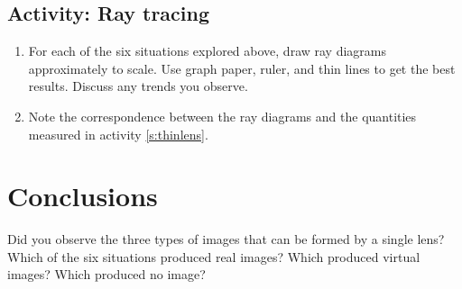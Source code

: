 \begin{multicols}{2}
\begin{enumerate}
\end{enumerate}

\subsection{Activity: Ray tracing}
\begin{enumerate} 
	\item For each of the six situations explored above, draw ray diagrams approximately to scale. Use graph paper, ruler, and thin lines to get the best results. Discuss any trends you observe. 
	\item Note the correspondence between the ray diagrams and the quantities measured in activity \ref{s:thinlens}.
\end{enumerate}

\section{Conclusions}
Did you observe the three types of images that can be formed by a single lens? Which of the six situations produced real images? Which produced virtual images? Which produced no image?  


 \end{multicols}
\endinput
